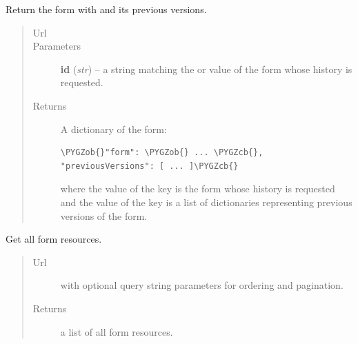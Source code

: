 \documentclass[letterpaper,10pt,english]{sphinxmanual}
\def\PYGZob{\char`\{}
\def\PYGZcb{\char`\}}
\begin{document}
\begin{fulllineitems}
\begin{fulllineitems}
\end{fulllineitems}


\begin{fulllineitems}
\label{api:onlinelinguisticdatabase.controllers.forms.FormsController.history}
Return the form with  and its previous versions.
\begin{quote}\begin{description}
\item[{Url }] \leavevmode
{}

\item[{Parameters}] \leavevmode
\textbf{id} (\emph{str}) -- a string matching the  or  value of the
form whose history is requested.

\item[{Returns}] \leavevmode

A dictionary of the form:

\begin{Verbatim}[commandchars=\\\{\}]
\PYGZob{}"form": \PYGZob{} ... \PYGZcb{}, "previousVersions": [ ... ]\PYGZcb{}
\end{Verbatim}

where the value of the  key is the form whose history is
requested and the value of the  key is a list of
dictionaries representing previous versions of the form.


\end{description}\end{quote}

\end{fulllineitems}


\begin{fulllineitems}
\label{api:onlinelinguisticdatabase.controllers.forms.FormsController.index}
Get all form resources.
\begin{quote}\begin{description}
\item[{Url }] \leavevmode
{} with optional query string parameters for ordering
and pagination.

\item[{Returns}] \leavevmode
a list of all form resources.


\end{description}
\end{quote}
\end{fulllineitems}
\end{fulllineitems}
\end{document}
